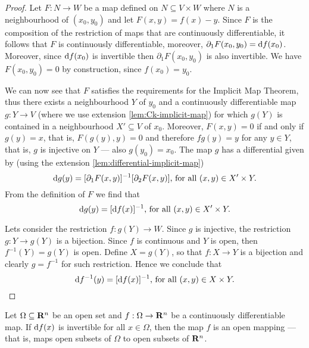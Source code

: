 \begin{proof}
Let \(F: N \to W\) be a map defined on \(N \subseteq V \times W\) where \(N\) is a
neighbourhood of \((x_0, y_0)\) and let \(F(x, y) = f(x) - y\). Since \(F\) is
the composition of the restriction of maps that are continuously
differentiable, it follows that \(F\) is continuously differentiable, moreover,
\(\partial_1F(x_0, y_0) = \mathrm{d} f(x_0)\).  Moreover, since \(\mathrm{d} f(x_0)\) is
invertible then \(\partial_1F(x_0, y_0)\) is also invertible. We have \(F(x_0, y_0) =
0\) by construction, since \(f(x_{0}) = y_0\).

We can now see that \(F\) satisfies the requirements for the Implicit Map
Theorem, thus there exists a neighbourhood \(Y\) of \(y_0\) and a
continuously differentiable map \(g: Y \to V\) (where we use extension
\cref{lem:Ck-implicit-map}) for which \(g(Y)\) is contained in a
neighbourhood \(X' \subseteq V\) of \(x_{0}\). Moreover, \(F(x, y) = 0\) if and only
if \(g(y) = x\), that is, \(F(g(y), y) = 0\) and therefore \(f g(y) = y\) for
any \(y \in Y\), that is, \(g\) is injective on \(Y\) --- also \(g(y_0) =
x_0\). The map \(g\) has a differential given by (using the extension
\cref{lem:differential-implicit-map})
\[
  \mathrm{d} g(y) = [\partial_{1} F(x, y)]^{-1} [\partial_2 F(x, y)] \text{, for all } (x, y) \in
  X' \times Y.
\]
From the definition of \(F\) we find that
\[
  \mathrm{d} g(y) = [\mathrm{d} f(x)]^{-1} \text{, for all } (x, y) \in X' \times Y.
\]

Lets consider the restriction \(f: g(Y) \to W\). Since \(g\) is injective, the
restriction \(g: Y \to g(Y)\) is a bijection. Since \(f\) is continuous and
\(Y\) is open, then \(f^{-1}(Y) = g(Y)\) is open. Define \(X = g(Y)\), so that
\(f: X \to Y\) is a bijection and clearly \(g = f^{-1}\) for such
restriction. Hence we conclude that
\[
  \mathrm{d} f^{-1}(y) = [\mathrm{d} f(x)]^{-1} \text{, for all } (x, y) \in X \times Y.
\]
\end{proof}

\begin{theorem}
\label{thm:open-map-theorem}
Let \(\Omega \subseteq \mathbf{R}^n\) be an open set and \(f: \Omega \to \mathbf{R}^{n}\) be a continuously
differentiable map. If \(\mathrm{d} f(x)\) is invertible for all \(x \in \Omega\), then
the map \(f\) is an open mapping --- that is, maps open subsets of \(\Omega\) to
open subsets of \(\mathbf{R}^n\).
\end{theorem}

